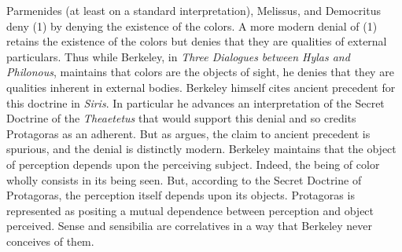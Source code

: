 Parmenides (at least on a standard interpretation), Melissus, and Democritus deny (1) by denying the existence of the colors. A more modern denial of (1) retains the existence of the colors but denies that they are qualities of external particulars. Thus while Berkeley, in \emph{Three Dialogues between Hylas and Philonous}, maintains that colors are the objects of sight, he denies that they are qualities inherent in external bodies. Berkeley himself cites ancient precedent for this doctrine in \emph{Siris}. In particular he advances an interpretation of the Secret Doctrine of the \emph{Theaetetus} that would support this denial and so credits Protagoras as an adherent. But as \citet{Burnyeat:1982mz} argues, the claim to ancient precedent is spurious, and the denial is distinctly modern. Berkeley maintains that the object of perception depends upon the perceiving subject. Indeed, the being of color wholly consists in its being seen. But, according to the Secret Doctrine of Protagoras, the perception itself depends upon its objects. Protagoras is represented as positing a mutual dependence between perception and object perceived. Sense and sensibilia are correlatives in a way that Berkeley never conceives of them.


